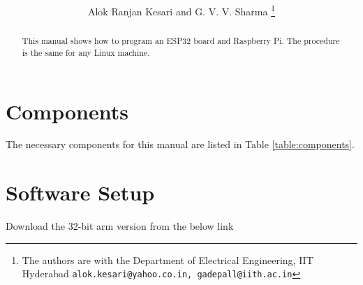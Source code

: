 \documentclass[journal,12pt,twocolumn]{IEEEtran}
\begin{document}

\def\putbox#1#2#3{\makebox[0in][l]{\makebox[#1][l]{}\raisebox{\baselineskip}[0in][0in]{\raisebox{#2}[0in][0in]{#3}}}}
     \def\rightbox#1{\makebox[0in][r]{#1}}
     \def\centbox#1{\makebox[0in]{#1}}
     \def\topbox#1{\raisebox{-\baselineskip}[0in][0in]{#1}}
     \def\midbox#1{\raisebox{-0.5\baselineskip}[0in][0in]{#1}}

\vspace{3cm}

\title{
}%
\author{Alok Ranjan Kesari and G. V. V. Sharma%
\thanks{ The authors are with the Department of Electrical Engineering, IIT Hyderabad
        {\tt\small alok.kesari@yahoo.co.in, gadepall@iith.ac.in}}%

}





\tableofcontents


\begin{abstract}
This manual shows how to program an ESP32 board  and Raspberry Pi. The procedure is the same for any Linux machine.
\end{abstract}
\section{Components}
The necessary components for this manual are listed in Table \ref{table:components}.
\begin{table}[!h]
\centering

\caption{}
\label{table:components}
\end{table}
%
\section{Software Setup}
Download the 32-bit arm version from the below link
\end{document}
